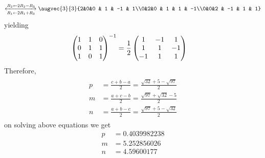 \documentclass[11pt]{book}
\begin{document}
\begin{enumerate}[label=\thesection.\arabic*.,ref=\thesection.\theenumi]
\begin{align}
\xleftrightarrow[R_1 \leftarrow 2R_1 + R_3]{R_2 \leftarrow 2R_2 - R_3}
\augvec{3}{3}{2&0&0 & 1 & -1 & 1\\0&2&0 & 1 & 1 & -1\\0&0&2 & -1 & 1 & 1}
\end{align}
yielding
\begin{align}
\begin{pmatrix}1&1&0\\0&1&1\\1&0&1\\\end{pmatrix}^{-1} &= \frac{1}{2}\begin{pmatrix}1 & -1 & 1\\ 1 & 1 & -1\\ -1 & 1 & 1\end{pmatrix}
	\end{align}
	Therefore,
\begin{align}
\begin{split}
    p&=\frac{c+b-a}{2}
    =\frac{\sqrt{32}+5-\sqrt{97}}{2}
    \\
    m&=\frac{a+c-b}{2}
    =\frac{\sqrt{97}+\sqrt{32}-5}{2}
    \\
    n&=\frac{a+b-c}{2}
    =\frac{\sqrt{97}+5-\sqrt{32}}{2}
\end{split}
\label{eq:incircle-mnp}
\end{align}
on solving above equations we get
\begin{align}
	p &= 0.4039982238\\
	m &= 5.252856026\\
	n &= 4.59600177
\end{align}
 

\end{enumerate}
\end{document}
